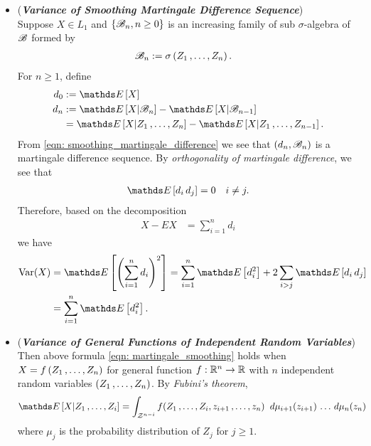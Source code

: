 \documentclass[11pt]{article}
\begin{document}
\begin{itemize}
\item \begin{remark} (\textbf{\emph{Variance of Smoothing Martingale Difference Sequence}})\\
Suppose $X \in L_1$ and $\left\{{\mathscr B}_n, n \ge 0\right\}$ is an increasing family of sub $\sigma$-algebra of ${\mathscr B}$ formed by 
\begin{align*}
{\mathscr B}_n &:= \sigma\left(Z_1 \,{,}\ldots{,}\, Z_n\right).
\end{align*} For $n \ge 1$, define 
\begin{align*}
d_0 &:= \E{}{X} \\ 
d_n &:= \E{}{X | \srB_n} - \E{}{X | \srB_{n-1}} \\
&= \E{}{X | Z_1 \xdotx{,} Z_n} -  \E{}{X | Z_1 \xdotx{,} Z_{n-1}}.
\end{align*} From \eqref{eqn: smoothing_martingale_difference} we see that $(d_n, {\mathscr B}_n)$ is a martingale difference sequence. By \emph{orthogonality of martingale difference}, we see that 
\begin{align*}
\E{}{d_i\, d_j} =0 \quad i\neq j.
\end{align*} Therefore, based on the decomposition
\begin{align*}
X - E{}{X} &= \sum_{i=1}^{n}d_i
\end{align*}
we have 
\begin{align}
\text{Var}(X) &= \E{}{\paren{\sum_{i=1}^{n}d_i}^2} = \sum_{i=1}^{n}\E{}{d_i^2} + 2 \sum_{i > j}\E{}{d_i\,d_j}\nonumber\\
&=  \sum_{i=1}^{n}\E{}{d_i^2}. \label{eqn: martingale_smoothing}
\end{align}
\end{remark}

\item \begin{remark}(\textbf{\emph{Variance of General Functions of Independent Random Variables}})\\
Then above formula \eqref{eqn: martingale_smoothing} holds when $X = f\left(Z_1 \,{,}\ldots{,}\, Z_n\right)$ for general function $f: {\mathbb R}^n \to {\mathbb R}$ with $n$ independent random variables $(Z_1 \,{,}\ldots{,}\, Z_n)$. By \emph{Fubini's theorem},
\begin{align*}
 \E{}{X | Z_1 \xdotx{,} Z_i} &= \int_{\cZ^{n-i}} f(Z_1 \xdotx{,} Z_i, z_{i+1} \xdotx{,} z_n) \;\;d\mu_{i+1}(z_{i+1})  \xdotx{} d\mu_{n}(z_{n})
\end{align*} where $\mu_j$ is the probability distribution of $Z_j$ for $j \ge 1$. 


\end{remark}
\end{itemize}
\end{document}
